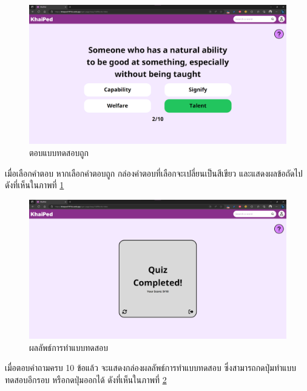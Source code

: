 \documentclass[12pt,oneside,openright,a4paper]{cpe-thai-project}
\begin{document}
\pagebreak
\begin{figure}[!h]\centering
	\includegraphics[width=\textwidth, keepaspectratio=true]{image/chap4/UI/quiz/correct.png}
	\caption{{ตอบแบบทดสอบถูก}}\label{fig:chap4UIQuizCorrect}
\end{figure}
\hspace{1cm}
เมื่อเลือกคำตอบ หากเลือกคำตอบถูก กล่องคำตอบที่เลือกจะเปลี่ยนเป็นสีเขียว และแสดงผลข้อถัดไป
ดังที่เห็นในภาพที่ \ref{fig:chap4UIQuizCorrect}

\begin{figure}[!h]\centering
	\includegraphics[width=\textwidth, keepaspectratio=true]{image/chap4/UI/quiz/result.png}
	\caption{{ผลลัพธ์การทำแบบทดสอบ}}\label{fig:chap4UIQuizResult}
\end{figure}
\hspace{1cm}
เมื่อตอบคำถามครบ 10 ข้อแล้ว จะแสดงกล่องผลลัพธ์การทำแบบทดสอบ ซึ่งสามารถกดปุ่มทำแบบทดสอบอีกรอบ หรือกดปุ่มออกได้
ดังที่เห็นในภาพที่ \ref{fig:chap4UIQuizResult}
\end{document}
